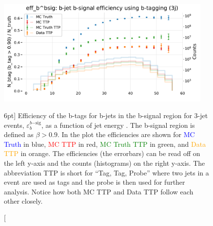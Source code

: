 \documentclass[a4paper, twoside, nobib]{tufte-book}
\newcommand{\code}[1]{\colorbox{light-gray}{\texttt{\detokenize{#1}}}}
\newcommand{\q}[1]{``#1''}
\begin{document}
\begin{figure}
  \includegraphics[width=0.95\textwidth, trim=0 0 0 40, clip]{figures/quarks/eff_b_bsig-down_sample=1.00-ML_vars=vertex-selection=b-ejet_min=4-n_iter_RS_lgb=99-n_iter_RS_xgb=9-cdot_cut=0.90-version=19.pdf}
  \caption[b-Tagging Efficiency $\varepsilon_b^{b\mathrm{-sig}}$ as a function of jet energy][6pt]
          {Efficiency of the b-tags for b-jets in the b-signal region for 3-jet events, $\varepsilon_b^{b\mathrm{-sig}}$, as a function of jet energy \code{Ejet}. The b-signal region is defined as $\beta > 0.9$. In the plot the efficiencies are shown for \textcolor{blue}{MC Truth} in blue, \textcolor{red}{MC TTP} in red, \textcolor{green}{MC Truth TTP} in green, and \textcolor{orange}{Data TTP} in orange. The efficiencies (the errorbars) can be read off on the left y-axis and the counts (histograms) on the right y-axis. The abbreviation TTP is short for \q{Tag, Tag, Probe} where two jets in a event are used as tags and the probe is then used for further analysis. Notice how both MC TTP and Data TTP follow each other closely.  
          } 
  \label{fig:q:effiency_btag_bjet_bsig}
\end{figure}
\end{document}
